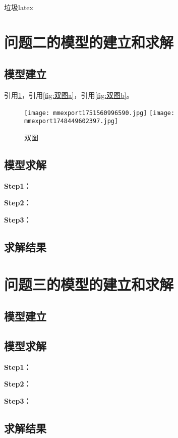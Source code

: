 \documentclass{cumcmthesis}
\begin{document}
垃圾latex

\section{问题二的模型的建立和求解}
\subsection{模型建立}

引用\cref{fig:双图}，引用\cref{fig:双图a}，引用\cref{fig:双图b}。

\begin{figure}[ht]
\centering
{}
{\texttt{[image: mmexport1751560996590.jpg]}}
{\texttt{[image: mmexport1748449602397.jpg]}}
\caption{双图}\label{fig:双图}
\end{figure} 

\subsection{模型求解}

\textbf{Step1：} 

\textbf{Step2：} 

\textbf{Step3：} 

\subsection{求解结果}


\section{问题三的模型的建立和求解}
\subsection{模型建立}

\subsection{模型求解}

\textbf{Step1：} 

\textbf{Step2：} 

\textbf{Step3：} 

\subsection{求解结果}
\end{document}
